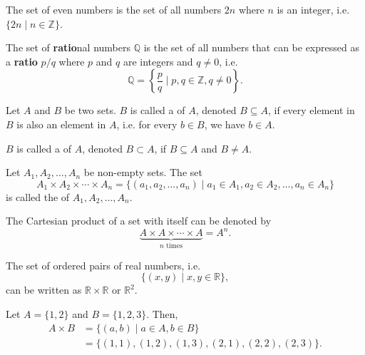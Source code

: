 \begin{exmp}
The set of even numbers is the set of all numbers $ 2n $ where $ n $ is an integer, i.e. $ \{2n\mid n\in\mathbb{Z}\} $.
\end{exmp}

\begin{exmp}
The set of \textbf{ratio}nal numbers $ \mathbb{Q} $ is the set of all numbers that can be expressed as a \textbf{ratio} $ p/q $ where $ p $ and $ q $ are integers and $ q\neq 0 $, i.e.
\begin{equation*}
    \mathbb{Q}=\left\{\frac{p}{q}\mid p,q\in\mathbb{Z},q\neq 0\right\}.
\end{equation*}
\end{exmp}

\begin{defn}
Let $ A $ and $ B $ be two sets. $ B $ is called a  of $ A $, denoted $ B\subseteq A $, if every element in $ B $ is also an element in $ A $, i.e. for every $ b\in B $, we have $ b\in A $.

$ B $ is called a  of $ A $, denoted $ B\subset A $, if $ B\subseteq A $ and $ B\neq A $.
\end{defn}

\begin{defn}
Let $ A_1,A_2,\ldots,A_n $ be non-empty sets. The set
\begin{equation*}
    A_1\times A_2\times \cdots\times A_n=\{(a_1,a_2,\ldots,a_n)\mid a_1\in A_1,a_2\in A_2,\ldots,a_n\in A_n\}
\end{equation*}
is called the  of $ A_1,A_2,\ldots,A_n $.

The Cartesian product of a set with itself can be denoted by
\begin{equation*}
    \underbrace{A\times A\times\cdots\times A}_{n\text{ times}}=A^n.
\end{equation*}
\end{defn}

\begin{exmp}
The set of ordered pairs of real numbers, i.e.
\begin{equation*}
    \{(x,y)\mid x,y\in\mathbb{R}\},
\end{equation*}
can be written as $ \mathbb{R}\times\mathbb{R} $ or $ \mathbb{R}^2 $.
\end{exmp}

\begin{exmp}
Let $ A=\{1,2\} $ and $ B=\{1,2,3\} $. Then,
\begin{align*}
    A\times B &= \{(a,b)\mid a\in A,b\in B\} \\
    &= \{(1,1),(1,2),(1,3),(2,1),(2,2),(2,3)\}.
\end{align*}
\end{exmp}

